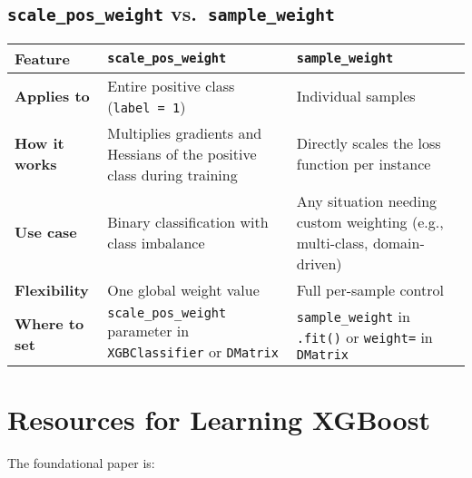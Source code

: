 \documentclass[
  letterpaper,
  DIV=11,
  numbers=noendperiod]{scrreprt}
\begin{document}
\subsection{\texorpdfstring{\texttt{scale\_pos\_weight}
vs.~\texttt{sample\_weight}}{scale\_pos\_weight vs.~sample\_weight}}\label{scale_pos_weight-vs.-sample_weight}

\begin{longtable}[]{@{}
  >{\raggedright\arraybackslash}p{}
  >{\raggedright\arraybackslash}p{}
  >{\raggedright\arraybackslash}p{}@{}}
\toprule\noalign{}
\begin{minipage}[b]{\linewidth}\raggedright
\textbf{Feature}
\end{minipage} & \begin{minipage}[b]{\linewidth}\raggedright
\textbf{\texttt{scale\_pos\_weight}}
\end{minipage} & \begin{minipage}[b]{\linewidth}\raggedright
\textbf{\texttt{sample\_weight}}
\end{minipage} \\
\midrule\noalign{}
\endhead
\bottomrule\noalign{}
\endlastfoot
\textbf{Applies to} & Entire positive class (\texttt{label\ =\ 1}) &
Individual samples \\
\textbf{How it works} & Multiplies gradients and Hessians of the
positive class during training & Directly scales the loss function per
instance \\
\textbf{Use case} & Binary classification with class imbalance & Any
situation needing custom weighting (e.g., multi-class, domain-driven) \\
\textbf{Flexibility} & One global weight value & Full per-sample
control \\
\textbf{Where to set} & \texttt{scale\_pos\_weight} parameter in
\texttt{XGBClassifier} or \texttt{DMatrix} & \texttt{sample\_weight} in
\texttt{.fit()} or \texttt{weight=} in \texttt{DMatrix} \\
\end{longtable}

\section{Resources for Learning
XGBoost}\label{resources-for-learning-xgboost}

The foundational paper is:
\end{document}

